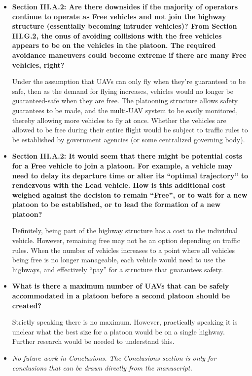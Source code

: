 \documentclass[submit]{aiaa-pretty}
\begin{document}
\begin{itemize}
\item\textbf{Section III.A.2: Are there downsides if the majority of operators continue to operate as Free vehicles and not join the highway structure (essentially becoming intruder vehicles)?  From Section III.G.2, the onus of avoiding collisions with the free vehicles appears to be on the vehicles in the platoon.  The required avoidance maneuvers could become extreme if there are many Free vehicles, right?}

Under the assumption that UAVs can only fly when they're guaranteed to be safe, then as the demand for flying increases, vehicles would no longer be guaranteed-safe when they are free. The platooning structure allows safety guarantees to be made, and the multi-UAV system to be easily monitored, thereby allowing more vehicles to fly at once. Whether the vehicles are allowed to be free during their entire flight would be subject to traffic rules to be established by government agencies (or some centralized governing body).

\item\textbf{Section III.A.2: It would seem that there might be potential costs for a Free vehicle to join a platoon.  For example, a vehicle may need to delay its departure time or alter its “optimal trajectory” to rendezvous with the Lead vehicle.  How is this additional cost weighed against the decision to remain “Free”, or to wait for a new platoon to be established, or to lead the formation of a new platoon?}

Definitely, being part of the highway structure has a cost to the individual vehicle. However, remaining free may not be an option depending on traffic rules. When the number of vehicles increases to a point where all vehicles being free is no longer manageable, each vehicle would need to use the highways, and effectively ``pay'' for a structure that guarantees safety.

\item\textbf{What is there a maximum number of UAVs that can be safely accommodated in a platoon before a second platoon should be created?}

Strictly speaking there is no maximum. However, practically speaking it is unclear what the best size for a platoon would be on a single highway. Further research would be needed to understand this.

\item\textit{No future work in Conclusions.  The Conclusions section is only for conclusions that can be drawn directly from the manuscript.}
\end{itemize}
\end{document}
